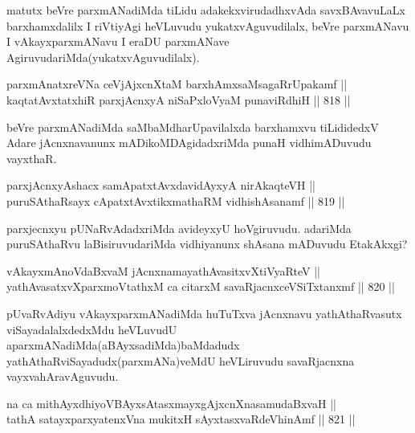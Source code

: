 \begin{artha}
matutx beVre parxmANadiMda tiLidu adakekxvirudadhxvAda savxBAvavuLaLx barxhamxdalilx I riVtiyAgi heVLuvudu yukatxvAguvudilalx, beVre parxmANavu I vAkayxparxmANavu I eraDU parxmANave AgiruvudariMda(yukatxvAguvudilalx).
\end{artha}

\begin{shl}
parxmAnatxreVNa ceVjAjxcnXtaM barxhAmxsaMsagaRrUpakamf || \\
kaqtatAvxtatxhiR parxjAcnxyA niSaPxloV\s yaM punaviRdhiH \hfill || 818 ||  
\end{shl}

\begin{artha}
beVre parxmANadiMda saMbaMdharUpavilalxda barxhamxvu tiLididedxV Adare jAcnxnavanunx mADikoMDAgidadxriMda punaH vidhimADuvudu vayxthaR.
\end{artha}


\begin{shl}
parxjAcnxyAshacx samApatxtAvxdavidAyxyA nirAkaqteVH || \\
puruSAthaRsayx cA\s \s patxtAvxtikxmathaRM vidhishAsanamf \hfill || 819 ||  
\end{shl}

\begin{artha}
parxjecnxyu pUNaRvAdadxriMda avideyxyU hoVgiruvudu. adariMda puruSAthaRvu laBisiruvudariMda vidhiyanunx shAsana mADuvudu EtakAkxgi?
\end{artha}


\begin{shl}
vAkayxmAnoVdaBxvaM jAcnxnamayathAvasitxvXtiVyaRteV || \\
yathAvasatxvXparxmoVtathxM ca citarxM savaRjacnxceVSiTxtanxmf \hfill || 820 ||  
\end{shl}

\begin{artha}
pUvaRvAdiyu vAkayxparxmANadiMda huTuTxva jAcnxnavu yathAthaRvasutx viSayadalalxdedxMdu heVLuvudU aparxmANadiMda(aBAyxsadiMda)baMdadudx yathAthaRviSayadudx(parxmANa)veMdU heVLiruvudu savaRjacnxna vayxvahAravAguvudu.
\end{artha}


\begin{shl}
na ca mithAyxdhiyoV\s BAyxsAtasxmayxgAjxcnXnasamudaBxvaH || \\
tathA satayxparxyatenxVna mukitxH sAyxtasxvaRdeVhinAmf \hfill || 821 ||  
\end{shl}

